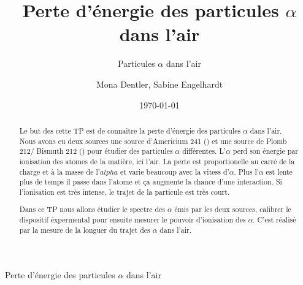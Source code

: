 \documentclass[a4paper,11pt]{scrartcl}
\title{Perte d'énergie des particules $\alpha$ dans l'air}
\subtitle{Particules $\alpha$ dans l'air}
\author{Mona Dentler, Sabine Engelhardt}
\date{\today}
\begin{document}
 \pagestyle{empty}
 \begin{center}
  \makeatletter
  \@subject
  \vspace{2cm}

  \Huge
  Perte d'énergie des particules $\alpha$ dans l'air\newline
  \vspace{1cm}
  \Large


  \@author
  \newline
  \@publishers


  \@date
  \makeatother
 \end{center}
 \vfill

 \begin{abstract}
  Le but des cette TP est de connaître la perte d'énergie des particules $\alpha$ dans l'air. Nous avons eu deux sources une source d'Americium 241 () et une source de Plomb 212/ Bismuth 212 () pour étudier des particules $\alpha$ différentes. L'$\alpha$ perd son énergie par ionisation des atomes de la matière, ici l'air. La perte est proportionelle au carré de la charge et à la masse de l'$alpha$ et varie beaucoup avec la vitess d'$\alpha$. Plus l'$\alpha$ est lente plus de temps il passe dans l'atome et \c ca augmente la chance d'une interaction. Si l'ionisation est très intense, le trajet de la particule est très court.

  Dans ce TP nous allons étudier le spectre des $\alpha$ émis par les deux sources, calibrer le dispositif éxpermental pour ensuite mesurer le pouvoir d'ionisation des $\alpha$. C'est réalisé par la mesure de la longuer du trajet des $\alpha$ dans l'air.
 \end{abstract}
\newpage
 \pagestyle{scrheadings}
 \tableofcontents
\newpage
\end{document}
